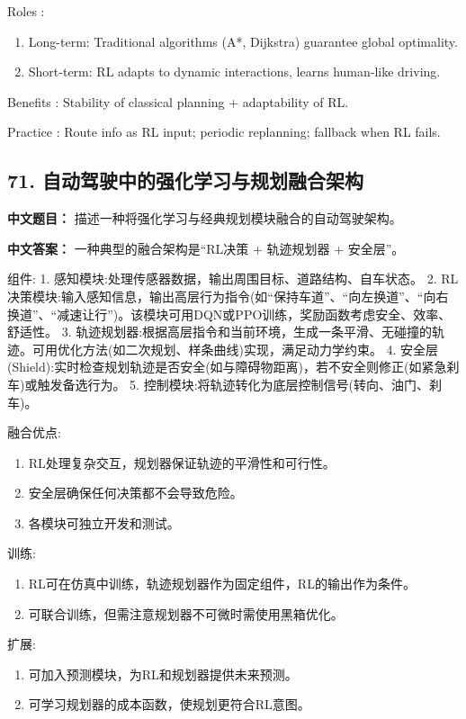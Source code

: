 \documentclass[10pt,a4paper]{ctexart}
\begin{document}
 Roles :
\begin{enumerate}
    \item Long-term: Traditional algorithms (A*, Dijkstra) guarantee global optimality.
    \item Short-term: RL adapts to dynamic interactions, learns human-like driving.
\end{enumerate}

 Benefits : Stability of classical planning + adaptability of RL.

 Practice : Route info as RL input; periodic replanning; fallback when RL fails.

\subsection*{71. 自动驾驶中的强化学习与规划融合架构}
\textbf{中文题目：} 描述一种将强化学习与经典规划模块融合的自动驾驶架构。

\textbf{中文答案：}  
一种典型的融合架构是“RL决策 + 轨迹规划器 + 安全层”。

 组件:
1.  感知模块:处理传感器数据，输出周围目标、道路结构、自车状态。
2.  RL决策模块:输入感知信息，输出高层行为指令(如“保持车道”、“向左换道”、“向右换道”、“减速让行”)。该模块可用DQN或PPO训练，奖励函数考虑安全、效率、舒适性。
3.  轨迹规划器:根据高层指令和当前环境，生成一条平滑、无碰撞的轨迹。可用优化方法(如二次规划、样条曲线)实现，满足动力学约束。
4.  安全层(Shield):实时检查规划轨迹是否安全(如与障碍物距离)，若不安全则修正(如紧急刹车)或触发备选行为。
5.  控制模块:将轨迹转化为底层控制信号(转向、油门、刹车)。

 融合优点:
\begin{enumerate}
    \item RL处理复杂交互，规划器保证轨迹的平滑性和可行性。
    \item 安全层确保任何决策都不会导致危险。
    \item 各模块可独立开发和测试。
\end{enumerate}

 训练:
\begin{enumerate}
    \item RL可在仿真中训练，轨迹规划器作为固定组件，RL的输出作为条件。
    \item 可联合训练，但需注意规划器不可微时需使用黑箱优化。
\end{enumerate}

 扩展:
\begin{enumerate}
    \item 可加入预测模块，为RL和规划器提供未来预测。
    \item 可学习规划器的成本函数，使规划更符合RL意图。
\end{enumerate}
\end{document}
